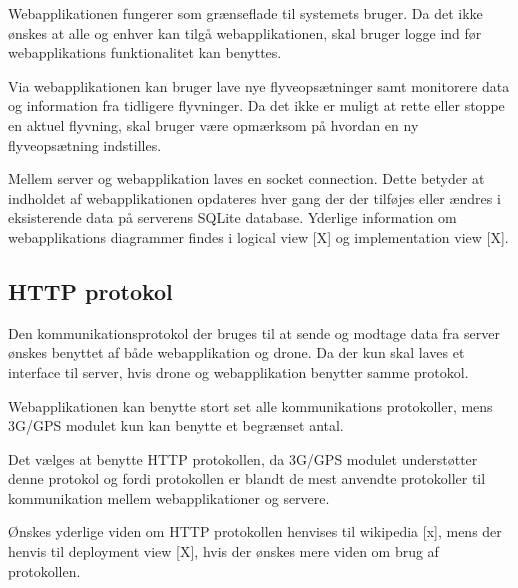 Webapplikationen fungerer som grænseflade til systemets bruger. Da det ikke ønskes at alle og enhver kan tilgå webapplikationen, skal bruger logge ind før webapplikations funktionalitet kan benyttes. 

Via webapplikationen kan bruger lave nye flyveopsætninger samt monitorere data og information fra tidligere flyvninger. Da det ikke er muligt at rette eller stoppe en aktuel flyvning, skal bruger være opmærksom på hvordan en ny flyveopsætning indstilles. 

Mellem server og webapplikation laves en socket connection. Dette betyder at indholdet af webapplikationen opdateres hver gang der der tilføjes eller ændres i eksisterende data på serverens SQLite database. Yderlige information om webapplikations diagrammer findes i logical view [X] og implementation view [X].


\subsection{HTTP protokol}

Den kommunikationsprotokol der bruges til at sende og modtage data fra server ønskes benyttet af både webapplikation og drone. Da der kun skal laves et interface til server, hvis drone og webapplikation benytter samme protokol.

Webapplikationen kan benytte stort set alle kommunikations protokoller, mens 3G/GPS modulet kun kan benytte et begrænset antal.

Det vælges at benytte HTTP protokollen, da 3G/GPS modulet understøtter denne protokol og fordi protokollen er blandt de mest anvendte protokoller til kommunikation mellem webapplikationer og servere.

Ønskes yderlige viden om HTTP protokollen henvises til wikipedia [x], mens der henvis til deployment view [X], hvis der ønskes mere viden om brug af protokollen. 